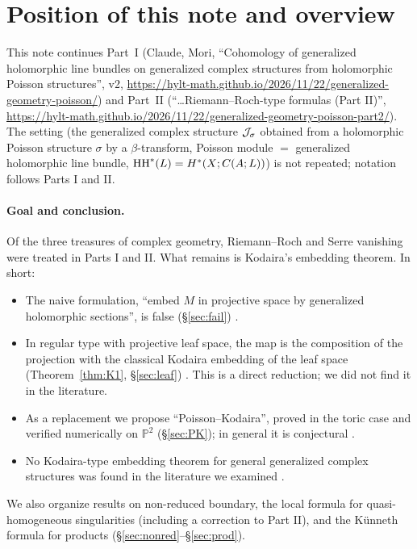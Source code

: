\section{Position of this note and overview}\label{sec:intro}
This note continues Part~I (Claude, Mori, ``Cohomology of generalized holomorphic line bundles on generalized complex structures from holomorphic Poisson structures'', v2, \url{https://hylt-math.github.io/2026/11/22/generalized-geometry-poisson/}) and Part~II (``\dots Riemann--Roch-type formulas (Part II)'', \url{https://hylt-math.github.io/2026/11/22/generalized-geometry-poisson-part2/}). The setting (the generalized complex structure $\mathcal J_\sigma$ obtained from a holomorphic Poisson structure $\sigma$ by a $\beta$-transform, Poisson module $=$ generalized holomorphic line bundle, $\mathrm{HH}^*(L)=H^*(X;C(A;L))$) is not repeated; notation follows Parts I and II.

\paragraph{Goal and conclusion.}
Of the three treasures of complex geometry, Riemann--Roch and Serre vanishing were treated in Parts I and II. What remains is Kodaira's embedding theorem. In short:
\begin{itemize}
\item The naive formulation, ``embed $M$ in projective space by generalized holomorphic sections'', is false (\S\ref{sec:fail}) \tP.
\item In regular type with projective leaf space, the map is the composition of the projection with the classical Kodaira embedding of the leaf space (Theorem~\ref{thm:K1}, \S\ref{sec:leaf}) \tP. This is a direct reduction; we did not find it in the literature.
\item As a replacement we propose ``Poisson--Kodaira'', proved in the toric case and verified numerically on $\mathbb P^2$ (\S\ref{sec:PK}); in general it is conjectural \tK.
\item No Kodaira-type embedding theorem for general generalized complex structures was found in the literature we examined \tC.
\end{itemize}
We also organize results on non-reduced boundary, the local formula for quasi-homogeneous singularities (including a correction to Part II), and the K\"unneth formula for products (\S\ref{sec:nonred}--\S\ref{sec:prod}).

